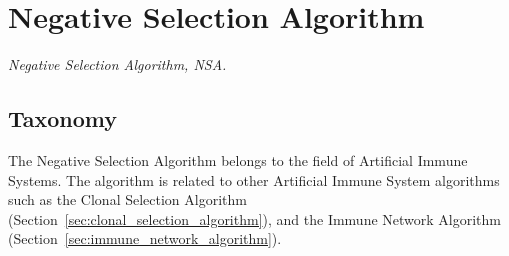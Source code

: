 

\section{Negative Selection Algorithm} 
\label{sec:negative_selection_algorithm}

\emph{Negative Selection Algorithm, NSA.}

\subsection{Taxonomy}
The Negative Selection Algorithm belongs to the field of Artificial Immune Systems.
The algorithm is related to other Artificial Immune System algorithms such as the Clonal Selection Algorithm (Section~\ref{sec:clonal_selection_algorithm}), and the Immune Network Algorithm (Section~\ref{sec:immune_network_algorithm}).

